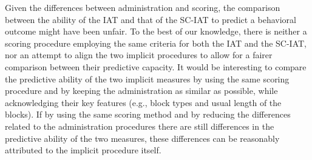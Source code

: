 \documentclass[12pt]{book}
\begin{document}

Given the differences between administration and scoring, the comparison between the ability of the IAT and that of the SC-IAT to predict a behavioral outcome might have been unfair. To the best of our knowledge, there is neither a scoring procedure employing the same criteria for both the IAT and the SC-IAT, nor an attempt to align the two implicit procedures to allow for a fairer comparison between their predictive capacity. It would be interesting to compare the predictive ability of the two implicit measures by using the same scoring procedure and by keeping the administration as similar as possible, while acknowledging their key features (e.g., block types and usual length of the blocks). If by using the same scoring method and by reducing the differences related to the administration procedures there are still differences in the predictive ability of the two measures, these differences can be reasonably attributed to the implicit procedure itself.
\end{document}
